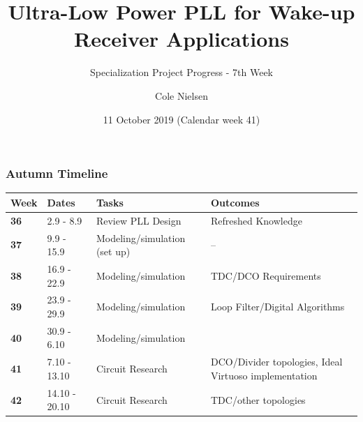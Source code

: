 \documentclass[t, screen, aspectratio=43]{beamer}
\title[Short title]{Ultra-Low Power PLL for Wake-up Receiver Applications}
\subtitle{Specialization Project Progress - 7th Week}
\author[C Nielsen]{Cole Nielsen}
\institute[NTNU]{Department of Electronic Systems, NTNU}
\date{11 October 2019 (Calendar week 41)}
\begin{document}
\begin{frame}
	\titlepage%
\end{frame}


\begin{frame}
	\frametitle{Autumn Timeline}
	\begin{table}[htb!]
		\tiny
		\centering
		\vspace{-1em}
		\def\arraystretch{1.5}		
		\setlength\arrayrulewidth{0.75pt}
		\setlength{\tabcolsep}{1em} %
		\begin{tabular}{|l|l|l|l|}
			\hline 
			\rule[-1ex]{0pt}{2.5ex} \cellcolor{gray!40}\textbf{Week} & \cellcolor{gray!40}\textbf{Dates} &\cellcolor{gray!40}\textbf{Tasks} & \cellcolor{gray!40}\textbf{Outcomes}\\ 
			\hline 
			\rule[-1ex]{0pt}{2.5ex} \cellcolor{red!20}\textbf{36}& \cellcolor{red!20}2.9 - 8.9 & \cellcolor{red!20}Review PLL Design & \cellcolor{red!20}Refreshed Knowledge\\ 
			\hline 
			\rule[-1ex]{0pt}{2.5ex} \cellcolor{red!20}\textbf{37}& \cellcolor{red!20}9.9 - 15.9 & \cellcolor{red!20}Modeling/simulation (set up) & \cellcolor{red!20}--\\ 
			\hline 
			\rule[-1ex]{0pt}{2.5ex} \cellcolor{red!20}\textbf{38}& \cellcolor{red!20}16.9 - 22.9 & \cellcolor{red!20}Modeling/simulation &\cellcolor{red!20} TDC/DCO Requirements\\ 
			\hline 
			\rule[-1ex]{0pt}{2.5ex} \cellcolor{red!20}\textbf{39}& \cellcolor{red!20}23.9 - 29.9& \cellcolor{red!20}Modeling/simulation& \cellcolor{red!20}Loop Filter/Digital Algorithms\\ 
			\hline 
			\rule[-1ex]{0pt}{2.5ex} \cellcolor{red!20}\textbf{40}& \cellcolor{red!20}30.9 - 6.10& \cellcolor{red!20}Modeling/simulation& \cellcolor{red!20}{Loop filter, DCO, TDC, calibration}\color{black}\\ 
			\hline 
			\rule[-1ex]{0pt}{2.5ex} \cellcolor{green!20}\textbf{41}&\cellcolor{green!20}7.10 - 13.10&\cellcolor{green!20}Circuit Research &\cellcolor{green!20}DCO/Divider topologies, Ideal Virtuoso implementation\\ 
			\hline 
			\rule[-1ex]{0pt}{2.5ex} \textbf{42}& 14.10 - 20.10& Circuit Research & TDC/other topologies\\ 

\end{tabular}
\end{table}
\end{frame}
\end{document}
